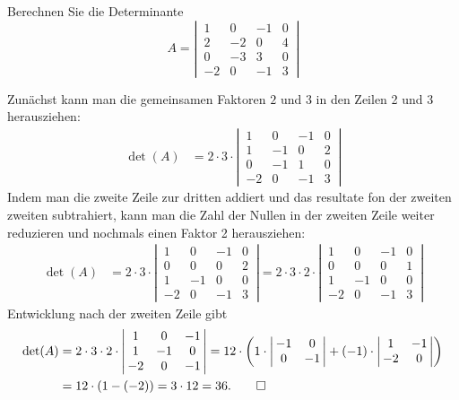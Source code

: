 Berechnen Sie die Determinante 
\[
A=\left|\,\begin{matrix}
 1& 0&-1&0\\
 2&-2& 0&4\\
 0&-3& 3&0\\
-2& 0&-1&3
\end{matrix}\,\right|
\]

\begin{loesung}
Zunächst kann man die gemeinsamen Faktoren $2$ und $3$ in den Zeilen 2 und 3
herausziehen:
\begin{align*}
\det(A)
&=
2\cdot 3\cdot
\left|\,\begin{matrix}
 1& 0&-1&0\\
 1&-1& 0&2\\
 0&-1& 1&0\\
-2& 0&-1&3
\end{matrix}\,\right|
\end{align*}
Indem man die zweite Zeile zur dritten addiert und das resultate fon der zweiten
zweiten subtrahiert,
kann man die Zahl der Nullen in der zweiten Zeile weiter reduzieren und
nochmals einen Faktor 2 herausziehen:
\begin{align*}
\det(A)
&=
2\cdot 3\cdot
\left|\,\begin{matrix}
 1& 0&-1&0\\
 0& 0& 0&2\\
 1&-1& 0&0\\
-2& 0&-1&3
\end{matrix}\,\right|
=
2\cdot 3\cdot2\cdot
\left|\,\begin{matrix}
 1& 0&-1&0\\
 0& 0& 0&1\\
 1&-1& 0&0\\
-2& 0&-1&3
\end{matrix}\,\right|
\end{align*}
Entwicklung nach der zweiten Zeile gibt
\begin{align*}
\det(A)
&=
2\cdot 3\cdot2\cdot
\left|\,\begin{matrix}
 1& 0&-1\\
 1&-1& 0\\
-2& 0&-1
\end{matrix}\,\right|
=
12\cdot \biggl(
1\cdot
\left|\,\begin{matrix}-1& 0\\ 0&-1\end{matrix}\,\right|
+
(-1)\cdot
\left|\,\begin{matrix} 1&-1\\-2& 0\end{matrix}\,\right|
\biggr)
\\
&=12\cdot(1-(-2))=3\cdot 12=36.
\qedhere
\end{align*}


\end{loesung}
